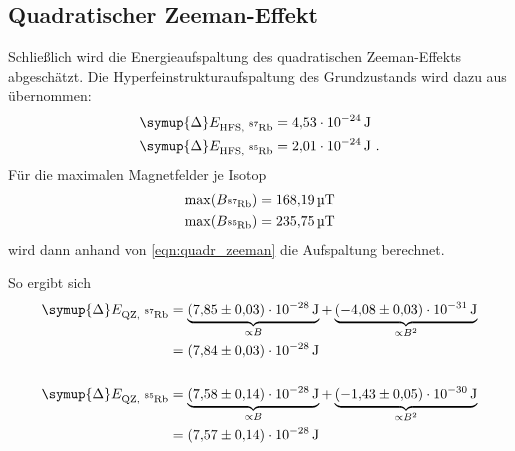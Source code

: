 \subsection{Quadratischer Zeeman-Effekt}
Schließlich wird die Energieaufspaltung des quadratischen Zeeman-Effekts abgeschätzt.
Die Hyperfeinstrukturaufspaltung des Grundzustands wird dazu aus \cite{versuchsanleitung} übernommen:
\begin{align*}
    \symup{\Delta}E_\text{HFS, \Rb{87}} &= \SI{4.53E-24}{\joule} \\
    \symup{\Delta}E_\text{HFS, \Rb{85}} &= \SI{2.01E-24}{\joule} \ .
\end{align*}
Für die maximalen Magnetfelder je Isotop
\begin{align*}
    \max(B_{\Rb{87}}) &= \SI{168.19}{\micro\tesla} \\
    \max(B_{\Rb{85}}) &= \SI{235.75}{\micro\tesla} \\
\end{align*}
wird dann anhand von \autoref{eqn:quadr_zeeman} die Aufspaltung berechnet.

So ergibt sich
\begin{align*}
    \symup{\Delta}E_\text{QZ, \Rb{87}} &=
        \underbrace{\SI{7.85(03)E-28}{\joule}}_{\propto B} +
        \underbrace{\SI{-4.08(03)E-31}{\joule}}_{\propto B^2} \\
        &= \SI{7.84(03)E-28}{\joule}
    \\
    \\
    \symup{\Delta}E_\text{QZ, \Rb{85}} &=
        \underbrace{\SI{7.58(14)E-28}{\joule}}_{\propto B} +
        \underbrace{\SI{-1.43(05)E-30}{\joule}}_{\propto B^2} \\
        &= \SI{7.57(14)E-28}{\joule}
\end{align*}
